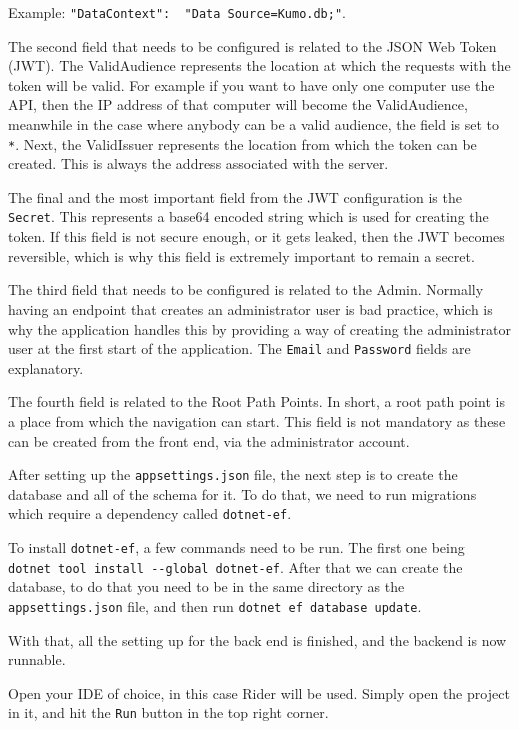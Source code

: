 Example: \verb|"DataContext":  "Data Source=Kumo.db;"|.

The second field that needs to be configured is related to the JSON Web Token  (JWT). The ValidAudience represents the location at which the requests with the token will be valid. For example if you want to have only one computer use the API, then the IP address of that computer will become the ValidAudience, meanwhile in the case where anybody can be a valid audience, the field is set to \verb|*|. Next, the ValidIssuer represents the location from which the token can be created. This is always the address associated with the server.

The final and the most important field from the JWT configuration is the \verb|Secret|. This represents a base64 encoded string which is used for creating the token. If this field is not secure enough, or it gets leaked, then the JWT becomes reversible, which is why this field is extremely important to remain a secret.

The third field that needs to be configured is related to the Admin. Normally having an endpoint that creates an administrator user is bad practice, which is why the application handles this by providing a way of creating the administrator user at the first start of the application. The \verb|Email| and \verb|Password| fields are explanatory.

The fourth field is related to the Root Path Points. In short, a root path point is a place from which the navigation can start. This field is not mandatory as these can be created from the front end, via the administrator account.

After setting up the \verb|appsettings.json| file, the next step is to create the database and all of the schema for it. To do that, we need to run migrations which require a dependency called \verb|dotnet-ef|. 

To install \verb|dotnet-ef|, a few commands need to be run. The first one being \verb|dotnet tool install --global dotnet-ef|. After that we can create the database, to do that you need to be in the same directory as the \verb|appsettings.json| file, and then run \verb|dotnet ef database update|.

With that, all the setting up for the back end is finished, and the backend is now runnable.

Open your IDE of choice, in this case Rider will be used. Simply open the project in it, and hit the \verb|Run| button in the top right corner.

